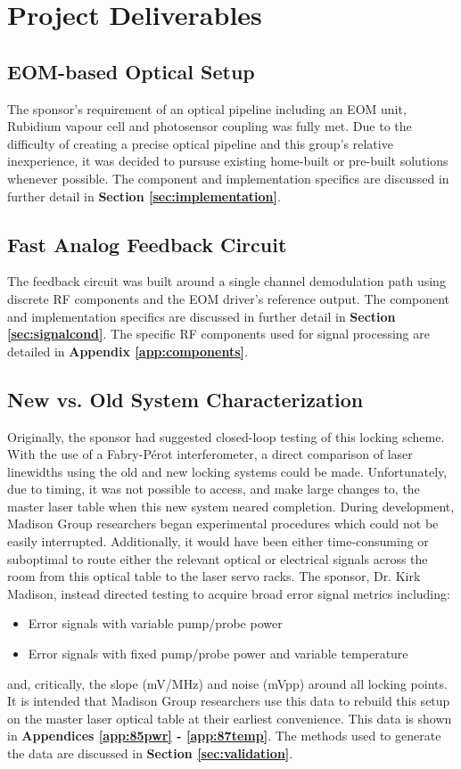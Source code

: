 \newpage
\section{Project Deliverables}

\subsection{EOM-based Optical Setup}

The sponsor's requirement of an optical pipeline including an EOM unit, Rubidium vapour cell and photosensor coupling was fully met. Due to the difficulty of creating a precise optical pipeline and this group's relative inexperience, it was decided to pursuse existing home-built or pre-built solutions whenever possible. The component and implementation specifics are discussed in further detail in \textbf{Section \ref{sec:implementation}}.

\subsection{Fast Analog Feedback Circuit}

The feedback circuit was built around a single channel demodulation path using discrete RF components and the EOM driver's reference output. The component and implementation specifics are discussed in further detail in \textbf{Section \ref{sec:signalcond}}. The specific RF components used for signal processing are detailed in \textbf{Appendix \ref{app:components}}.

\subsection{New vs. Old System Characterization}

Originally, the sponsor had suggested closed-loop testing of this locking scheme. With the use of a Fabry-P{\'e}rot interferometer, a direct comparison of laser linewidths using the old and new locking systems could be made. Unfortunately, due to timing, it was not possible to access, and make large changes to, the master laser table when this new system neared completion. During development, Madison Group researchers began experimental procedures which could not be easily interrupted. Additionally, it would have been either time-consuming or suboptimal to route either the relevant optical or electrical signals across the room from this optical table to the laser servo racks. The sponsor, Dr. Kirk Madison, instead directed testing to acquire broad error signal metrics including:
\begin{itemize}
    \item Error signals with variable pump/probe power
    \item Error signals with fixed pump/probe power and variable temperature
\end{itemize}
and, critically, the slope (mV/MHz) and noise (mVpp) around all locking points. It is intended that Madison Group researchers use this data to rebuild this setup on the master laser optical table at their earliest convenience. This data is shown in \textbf{Appendices \ref{app:85pwr} - \ref{app:87temp}}. The methods used to generate the data are discussed in \textbf{Section \ref{sec:validation}}.